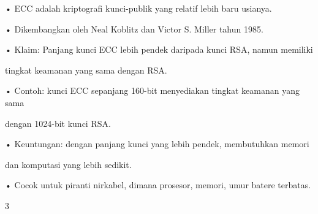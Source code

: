 \documentclass{article}
\begin{document}

• ECC adalah kriptografi kunci-publik yang relatif lebih baru usianya.

• Dikembangkan oleh Neal Koblitz dan Victor S. Miller tahun 1985.

• Klaim: Panjang kunci ECC lebih pendek daripada kunci RSA, namun memiliki 

tingkat keamanan yang sama dengan RSA.

• Contoh: kunci ECC sepanjang 160-bit menyediakan tingkat keamanan yang sama 

dengan 1024-bit kunci RSA.

• Keuntungan: dengan panjang kunci yang lebih pendek, membutuhkan memori 

dan komputasi yang lebih sedikit.

• Cocok untuk piranti nirkabel, dimana prosesor, memori, umur batere terbatas. 

3
\end{document}
